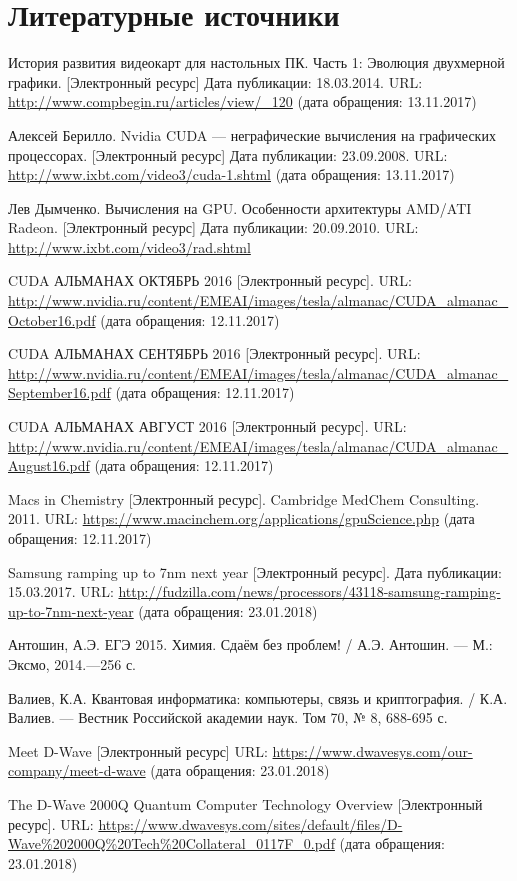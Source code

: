 \newpage
\section{Литературные источники}

\begin{thebibliography}{20}

История развития видеокарт для настольных ПК. Часть 1: Эволюция двухмерной графики. [Электронный ресурс] Дата публикации: 18.03.2014. URL: \url{http://www.compbegin.ru/articles/view/_120} (дата обращения: 13.11.2017)

Алексей Берилло. Nvidia CUDA --- неграфические вычисления на графических процессорах. [Электронный ресурс] Дата публикации: 23.09.2008. URL: \url{http://www.ixbt.com/video3/cuda-1.shtml} (дата обращения: 13.11.2017)

Лев Дымченко. Вычисления на GPU. Особенности архитектуры AMD/ATI Radeon. [Электронный ресурс] Дата публикации: 20.09.2010. URL: \url{http://www.ixbt.com/video3/rad.shtml}

CUDA\textsuperscript{\textregistered} АЛЬМАНАХ ОКТЯБРЬ 2016 [Электронный ресурс]. URL: \url{http://www.nvidia.ru/content/EMEAI/images/tesla/almanac/CUDA_almanac_October16.pdf} (дата обращения: 12.11.2017)

CUDA\textsuperscript{\textregistered} АЛЬМАНАХ СЕНТЯБРЬ 2016 [Электронный ресурс]. URL: \url{http://www.nvidia.ru/content/EMEAI/images/tesla/almanac/CUDA_almanac_September16.pdf} (дата обращения: 12.11.2017)

CUDA\textsuperscript{\textregistered} АЛЬМАНАХ АВГУСТ 2016 [Электронный ресурс]. URL: \url{http://www.nvidia.ru/content/EMEAI/images/tesla/almanac/CUDA_almanac_August16.pdf} (дата обращения: 12.11.2017)

Macs in Chemistry [Электронный ресурс]. Cambridge MedChem Consulting. 2011. URL: \url{https://www.macinchem.org/applications/gpuScience.php} (дата обращения: 12.11.2017)

Samsung ramping up to 7nm next year [Электронный ресурс]. Дата публикации: 15.03.2017. URL: \url{http://fudzilla.com/news/processors/43118-samsung-ramping-up-to-7nm-next-year} (дата обращения: 23.01.2018)

Антошин, А.Э. ЕГЭ 2015. Химия. Сдаём без проблем! / А.Э. Антошин. --- М.: Эксмо, 2014.---256 с.

Валиев, К.А. Квантовая информатика: компьютеры, связь и криптография. / К.А. Валиев. --- Вестник Российской академии наук. Том 70, № 8, 688-695 с.

Meet D-Wave [Электронный ресурс] URL: \url{https://www.dwavesys.com/our-company/meet-d-wave} (дата обращения: 23.01.2018)

The D-Wave 2000Q\textsuperscript{\textregistered} Quantum Computer Technology Overview [Электронный ресурс]. URL: \url{https://www.dwavesys.com/sites/default/files/D-Wave%202000Q%20Tech%20Collateral_0117F_0.pdf} (дата обращения: 23.01.2018)
\end{thebibliography}
